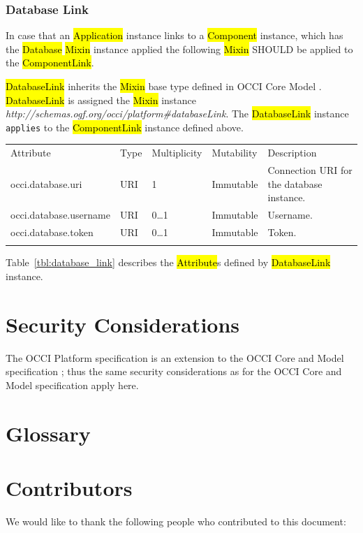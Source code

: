 \documentclass[10pt,a4paper]{article}
\begin{document}
\subsubsection{Database Link}
In case that an \hl{Application} instance links to a \hl{Component} instance, which has the \hl{Database} \hl{Mixin} instance applied the following \hl{Mixin} SHOULD be applied to the \hl{ComponentLink}.

\hl{DatabaseLink} inherits the \hl{Mixin} base type defined in OCCI Core Model \cite{occi:core}. \hl{DatabaseLink} is assigned the \hl{Mixin} instance \textit{http://schemas.ogf.org/occi/platform\#databaseLink}. The \hl{DatabaseLink} instance \texttt{applies} to the \hl{ComponentLink} instance defined above.

{
	\begin{tabular}{lp{2.5cm}p{1cm}lp{5cm}}
	\toprule
	Attribute&Type&Multi\-plicity&Mutability&Description\\
	\colrule
	occi.database.uri & URI & 1 & Immutable & Connection URI for the database instance.\\
	occi.database.username & URI & 0\ldots1 & Immutable & Username.\\
	occi.database.token & URI & 0\ldots1 & Immutable & Token.\\
	\botrule
	\end{tabular}
}

Table~\ref{tbl:database_link} describes the \hl{Attribute}s defined by \hl{DatabaseLink} instance.


\section{Security Considerations}
The OCCI Platform specification is an extension to the OCCI Core
and Model specification \cite{occi:core}; thus the same security
considerations as for the OCCI Core and Model specification apply
here.

\section{Glossary}
\label{sec:glossary}


\section{Contributors}
We would like to thank the following people who contributed to this
document:
\end{document}
